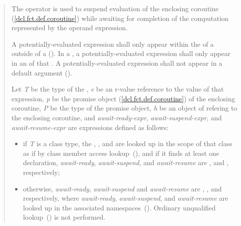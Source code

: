 \begin{quote}
\pnum
The  operator is used to suspend evaluation of the enclosing coroutine (\ref{dcl.fct.def.coroutine}) while awaiting
for completion of the computation represented by the operand expression.

\pnum
A potentially-evaluated 
 expression shall only appear within the  of a  outside of a  ().
In a , a potentially-evaluated  expression shall only appear in an  of that .
A potentially-evaluated  expression shall not appear in a default argument ().

\pnum
Let \textit{T} be the type of the ,
\textit{e} be an r-value reference to the value of that expression,  \textit{p} be the promise object (\ref{dcl.fct.def.coroutine})
of the enclosing coroutine, \textit{P} be the type of the promise object, \textit{h} be an object of  refering to the enclosing coroutine, and \textit{await-ready-expr}, \textit{await-suspend-expr}, and \textit{await-resume-expr} are expressions defined as follows:
\begin{itemize}
  \item if \textit{T}  is a class type, the 
  , , and  are 
  looked up in the scope of that class
  as if by class member access lookup~(), and if it finds at least one declaration, 
  \textit{await-ready}, \textit{await-suspend}, and \textit{await-resume} are
  ,  and ,
  respectively;
  
  \item otherwise, \textit{await-ready}, \textit{await-suspend} and \textit{await-resume} are 
  , 
  , and  
  respectively, where 
  \textit{await-ready}, \textit{await-suspend}, and \textit{await-resume} are 
  looked up in the associated namespaces~().
  \enternote Ordinary unqualified lookup~() is not
  performed. \exitnote


\end{itemize}
\end{quote}
